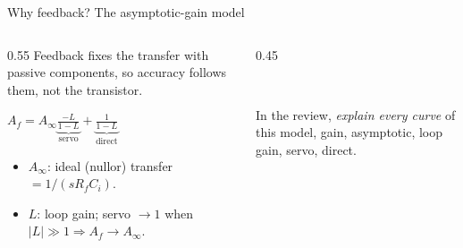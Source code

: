 \documentclass[aspectratio=169,9pt]{beamer}
\begin{document}
\begin{frame}{Why feedback? The asymptotic-gain model}
  \begin{columns}[T]
    \begin{column}{0.55\textwidth}
      Feedback fixes the transfer with passive components, so accuracy follows them, not the
      transistor.
      \begin{resultbox}
        $\displaystyle A_f=A_\infty\underbrace{\frac{-L}{1-L}}_{\text{servo}}
        +\underbrace{\frac{1}{1-L}}_{\text{direct}}$
      \end{resultbox}
      \begin{itemize}
        \item $A_\infty$: ideal (nullor) transfer $=1/(sR_fC_i)$.
        \item $L$: loop gain; servo $\to1$ when $|L|\gg1\Rightarrow A_f\to A_\infty$.
      \end{itemize}
    \end{column}
    \begin{column}{0.45\textwidth}
      \centering
      \\[0.3em]
      \begin{antoonbox}
      In the review, \emph{explain every curve} of this model, gain, asymptotic, loop gain,
      servo, direct.
      \end{antoonbox}
    \end{column}
  \end{columns}
\end{frame}
\end{document}

